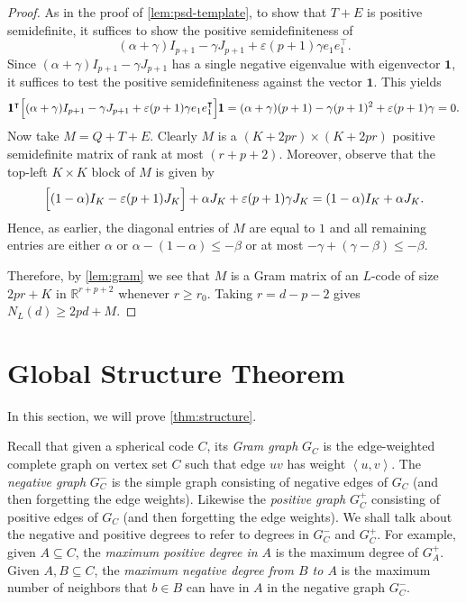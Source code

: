 \documentclass[reqno, 11pt]{amsart}
\theoremstyle{definition}
\theoremstyle{remark}
\newcommand{\ang}[1]{\left\langle #1 \right\rangle}
\newcommand{\RR}{\mathbb{R}}
\begin{document}
\begin{proof}
As in the proof of \cref{lem:psd-template}, to show that $T+E$ is positive semidefinite, it suffices to show the positive semidefiniteness of
\[
    (\alpha + \gamma)I_{p+1} - \gamma J_{p+1} + \varepsilon(p+1)\gamma e_1 e_1^\intercal. 
\]
Since $(\alpha + \gamma)I_{p+1} - \gamma J_{p+1}$ has a single negative eigenvalue with eigenvector $\pmb{1}$, it suffices to test the positive semidefiniteness against the vector $\pmb{1}$. This yields
\[
  \pmb{1}^\intercal \Bigl[(\alpha + \gamma)I_{p+1} - \gamma J_{p+1} + \varepsilon(p+1)\gamma e_1 e_1^\intercal\Bigr] \pmb{1}=  (\alpha + \gamma)(p+1) - \gamma(p+1)^2 + \varepsilon (p+1) \gamma = 0.
\]
Now take $M = Q + T + E$. Clearly $M$ is a $(K + 2pr) \times (K + 2pr)$ positive semidefinite matrix of rank at most $(r + p + 2)$. Moreover, observe that the top-left $K \times K$ block of $M$ is given by
\[
    \Bigl[(1-\alpha)I_{K} - \varepsilon (p+1) J_{K}\Bigr] + \alpha J_{K} + \varepsilon (p+1) \gamma J_{K} =  (1-\alpha)I_{K} + \alpha J_{K}.
\]
Hence, as earlier, the diagonal entries of $M$ are equal to $1$ and all remaining entries are either $\alpha$ or $\alpha - (1-\alpha) \leq -\beta$ or at most $-\gamma + (\gamma - \beta) \leq -\beta$.

Therefore, by \cref{lem:gram} we see that $M$ is a Gram matrix of an $L$-code of size $2pr + K$ in $\RR^{r+p+2}$ whenever $r \geq r_0$. Taking $r = d-p-2$ gives $N_L(d) \geq 2pd + M$.
\end{proof}

\section{Global Structure Theorem}\label{sec:global}

In this section, we will prove \cref{thm:structure}. 

Recall that given a spherical code $C$, its \emph{Gram graph} $G_C$ is the edge-weighted complete graph on vertex set $C$ such that edge $uv$ has weight $\ang{u,v}$. The \emph{negative graph} $G_C^-$ is the simple graph consisting of negative edges of $G_C$ (and then forgetting the edge weights). Likewise the \emph{positive graph} $G_C^+$ consisting of positive edges of $G_C$ (and then forgetting the edge weights).
We shall talk about the negative and positive degrees to refer to degrees in $G_C^-$ and $G_C^+$. For example, given $A \subseteq C$, the \emph{maximum positive degree in $A$} is the maximum degree of $G_A^+$. Given $A,B \subseteq C$, the \emph{maximum negative degree from $B$ to $A$} is the maximum number of neighbors that $b \in B$ can have in $A$ in the negative graph $G_C^-$.
\end{document}
